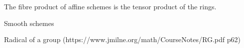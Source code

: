 %

\begin{lemma}
  \label{a}
  The fibre product of affine schemes is the tensor product of the rings.
\end{lemma}

\begin{definition}
  \label{smoothscheme}
  Smooth schemes
\end{definition}

\begin{definition}
  \label{radical}
  Radical of a group (https://www.jmilne.org/math/CourseNotes/RG.pdf p62)
\end{definition}


